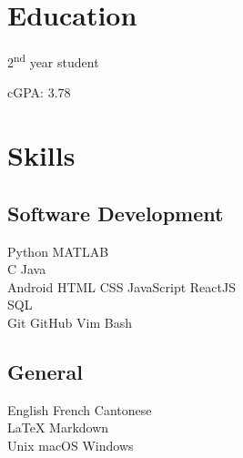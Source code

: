 
\begin{minipage}[t]{0.33\textwidth} %

\section{Education}

\vspace{\topsep} %
\vspace{1pt}
\begin{tightitemize}
\item 2\textsuperscript{nd} year student
\item cGPA: 3.78
\end{tightitemize}


\sectionspace %

\section{Skills}

\subsection{Software Development}
Python \textbullet{}  MATLAB \\
C \textbullet{} Java \\
Android \textbullet{} HTML \textbullet{} CSS \textbullet{} JavaScript ReactJS\\
SQL\\
Git \textbullet{} GitHub \textbullet{} Vim \textbullet{} Bash\\
\sectionspace %

\subsection{General}
English \textbullet{} French \textbullet{} Cantonese\\
\LaTeX \textbullet{} Markdown \\
Unix \textbullet{} macOS \textbullet{} Windows\\


\end{minipage}

